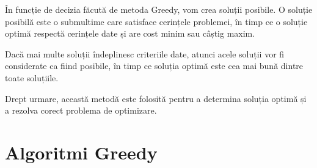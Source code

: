 \vspace{0.5cm}
În funcție de decizia făcută de metoda Greedy, vom crea soluții posibile. O soluție posibilă este o submultime care satisface cerințele problemei, în timp ce o soluție optimă respectă cerințele date și are cost minim sau câștig maxim.
\par 
Dacă mai multe soluții îndeplinesc criteriile date, atunci acele soluții vor fi considerate ca fiind posibile, în timp ce soluția optimă este cea mai bună dintre toate soluțiile.
\par 
Drept urmare, această metodă este folosită pentru a determina
soluția optimă și a rezolva corect problema de optimizare.


\section{Algoritmi Greedy}
